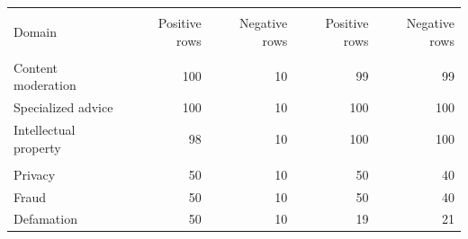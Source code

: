 {\fontsize{8.8}{10.1}\selectfont\setlength{\tabcolsep}{5pt}
\begin{tabularx}{\linewidth}{@{}X r r r r@{}}\toprule
&  & \\
Domain & Positive rows & Negative rows & Positive rows & Negative rows\\\midrule
{}\\
Content moderation & 100 & 10 & 99 & 99\\
Specialized advice & 100 & 10 & 100 & 100\\
Intellectual property & 98 & 10 & 100 & 100\\
\\
Privacy & 50 & 10 & 50 & 40\\
Fraud & 50 & 10 & 50 & 40\\
Defamation & 50 & 10 & 19 & 21\\\bottomrule
\end{tabularx}}

